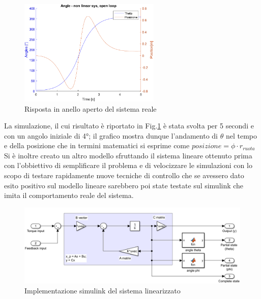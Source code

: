 \begin{figure}[H]
	\centering   	
	\includegraphics[width=0.6\textwidth]{Immagini/open_loop_response_non_linear.png}
	\caption{Risposta in anello aperto del sistema reale}
	\label{fig:open_loop_response_non_linear}
\end{figure}
La simulazione, il cui risultato è riportato in Fig.\ref{fig:open_loop_response_non_linear} è stata svolta per 5 secondi e con un angolo iniziale di 4°; il grafico mostra dunque l'andamento di $\theta$ nel tempo e della posizione che in termini matematici si esprime come $posizione = \phi \cdot{r_{ruota}}$
Si è inoltre creato un altro modello sfruttando il sistema lineare ottenuto prima  con l'obbiettivo di semplificare il problema e di velocizzare le simulazioni con lo scopo di testare rapidamente nuove tecniche di controllo che se avessero dato esito positivo sul modello lineare sarebbero poi state testate sul simulink che imita il comportamento reale del sistema.
\begin{figure}[H]
	\centering   	
	\includegraphics[width=1\textwidth]{Immagini/linear_system.png}
	\caption{Implementazione simulink del sistema linearizzato}
	\label{fig:linear_system}
\end{figure}

